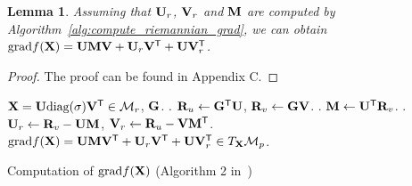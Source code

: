 \documentclass[10pt,twocolumn,letterpaper]{article}
\newtheorem{lemma}{Lemma}
\newcommand\mycomment[1]{}
\def\ranksym{p}
\def\symp{r}
\def\M{\mathcal{M}}
\def\bR{{\bf R}}
\def\U{{\bf U}}
\def\V{{\bf V}}
\def\diag{\mbox{diag}}
\def\trsp{{\sf T}}
\def\G{{\bf G}}
\def\grad{{\text{grad}}}
\def\bM{{\bf M}}
\def\bI{{\bf I}}
\def\bX{{\bf X}}
\def\bI{{\bf I}}
\def\bX{{\bf X}}
\begin{document}
\begin{lemma}
  Assuming that $\U_{\symp}$, $\V_{\symp}$ and $\bM$ are computed by Algorithm~\ref{alg:compute_riemannian_grad},
  we can obtain {${\textnormal{grad}} f(\bX) = \U \bM \V + \U_{\symp} \V^{\trsp} + \U \V^{\trsp}_{\symp}$}.
\end{lemma}

\begin{proof}
  The proof can be found in Appendix C.
  \mycomment{
\begin{align}
\label{eq:proof_lemma1}
       & \grad f(\bX) \\
       & = \U \bM \V^{\trsp} + \U_{\symp} \V^{\trsp} + \U \V_{\symp}^{\trsp}  \nonumber \\
       & = \U(\U^{\trsp} \G \V) \V^{\trsp} + (\bR_{v} - \U \bM) \V^{\trsp} + \U (\bR_{u} - \V \bM^{\trsp})^{\trsp} \nonumber \\
       & = P_{\U} \G P_{V} + \G \V \V^{\trsp} - \U \bM \V^{\trsp} + \U \U^{\trsp} \G - \U \bM \V^{\trsp} \nonumber \\
       & = P_{\U} \G P_{V} + \G P_{V} - 2\U \bM \V^{\trsp} + P_{U} \G  \nonumber \\
       & = P_{\U} \G P_{V} + \G P_{V} - 2\U (\U^{\trsp} \bR_{v}) \V^{\trsp} + P_{U} \G  \nonumber \\
       & = P_{\U} \G P_{V} + \G P_{V} - 2\U (\U^{\trsp} \G \V) \V^{\trsp} + P_{U} \G  \nonumber \\
       & = P_{\U} \G P_{V} + (\bI - P_{U}) \G P_{V} + P_{U} \G (\bI - P_{V})  \nonumber \\
       & = P_{\U} \G P_{V} + P_{U}^{\perp} \G P_{V} + P_{U} \G P_{V}^{\perp}  ,
\end{align}
}
\end{proof}


\begin{algorithm}
  \begin{algorithmic}
    \REQUIRE $\bX = \U \diag(\sigma) \V^{\trsp} \in \M_{r}$, $\G$.
    . $\bR_{u} \leftarrow \G^{\trsp} \U$, $\bR_{v} \leftarrow \G \V$.
    . $\bM \leftarrow \U^{\trsp} \bR_{v}$.
    . $\U_{\symp} \leftarrow \bR_{v} - \U \bM$, $\V_{\symp} \leftarrow \bR_{u} - \V \bM^{\trsp}$.
    \ENSURE $\grad f(\bX) = \U \bM \V^{\trsp} + \U_{\symp} \V^{\trsp} + \U \V_{\symp}^{\trsp} \in T_{\bX}\M_{\ranksym}$.
  \end{algorithmic}
  \caption{Computation of $\grad f(\bX)$ (Algorithm 2 in~\cite{vandereycken2013lowrank})}
  \label{alg:compute_riemannian_grad}
\end{algorithm}
\end{document}

